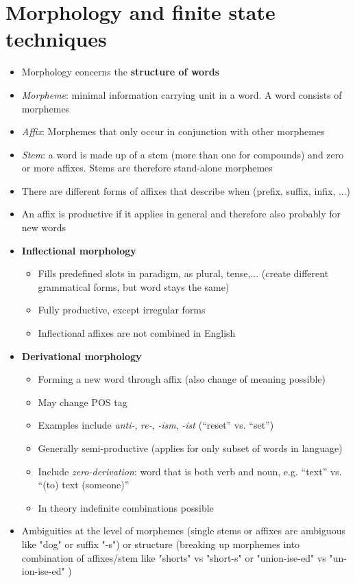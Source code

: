 \section{Morphology and finite state techniques}
\begin{itemize}
	\item Morphology concerns the \textbf{structure of words}
	\item \textit{Morpheme}: minimal information carrying unit in a word. A word consists of morphemes
	\item \textit{Affix}: Morphemes that only occur in conjunction with other morphemes
	\item \textit{Stem}: a word is made up of a stem (more than one for compounds) and zero or more affixes. Stems are therefore stand-alone morphemes
	\item There are different forms of affixes that describe when (prefix, suffix, infix, ...)
	\item An affix is productive if it applies in general and therefore also probably for new words
	\item \textbf{Inflectional morphology}
	\begin{itemize}
		\item Fills predefined slots in paradigm, as plural, tense,... (create different grammatical forms, but word stays the same)
		\item Fully productive, except irregular forms
		\item Inflectional affixes are not combined in English
	\end{itemize}
	\item \textbf{Derivational morphology}
	\begin{itemize}
		\item Forming a new word through affix (also change of meaning possible)
		\item May change POS tag
		\item Examples include \textit{anti-}, \textit{re-}, \textit{-ism}, \textit{-ist} (``reset'' vs. ``set'')
		\item Generally semi-productive (applies for only subset of words in language)
		\item Include \textit{zero-derivation}: word that is both verb and noun, e.g. ``text'' vs. ``(to) text (someone)''
		\item In theory indefinite combinations possible
	\end{itemize}
	\item Ambiguities at the level of morphemes (single stems or affixes are ambiguous like "dog" or suffix "-s") or structure (breaking up morphemes into combination of affixes/stem like "shorts" vs "short-s" or "union-ise-ed" vs "un-ion-ise-ed" )

\end{itemize}
